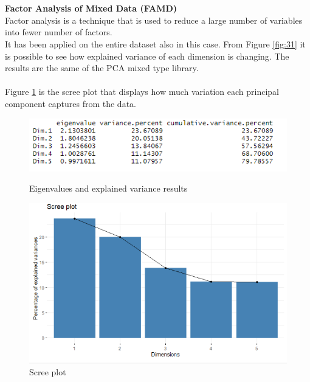 \documentclass{FR16}
\begin{document}
\noindent 
\\\\
\textbf{Factor Analysis of Mixed Data (FAMD)}\\
Factor analysis is a technique that is used to reduce a large number of variables into fewer number of factors. 
\\
It has been applied on the entire dataset also in this case. From Figure \ref{fig:31} it is possible to see how explained variance of each dimension is changing. The results are the same of the PCA mixed type library. 
\\\\
\noindent Figure \ref{fig:32} is the scree plot that displays how much variation each principal component captures from the data.

\begin{figure}[!htb]
   \begin{minipage}{0.48\textwidth}
     \centering
    \includegraphics[width=1\textwidth]{figures/FAMD.PNG} 
 \caption{\label{fig:31} Eigenvalues and explained variance results}
   \end{minipage}\hfill
   \begin{minipage}{0.48\textwidth}
     \centering
       \includegraphics[width=1\textwidth]{figures/FAMD2.PNG} 
 \caption{\label{fig:32} Scree plot }
   \end{minipage}
   
\end{figure}
\end{document}
